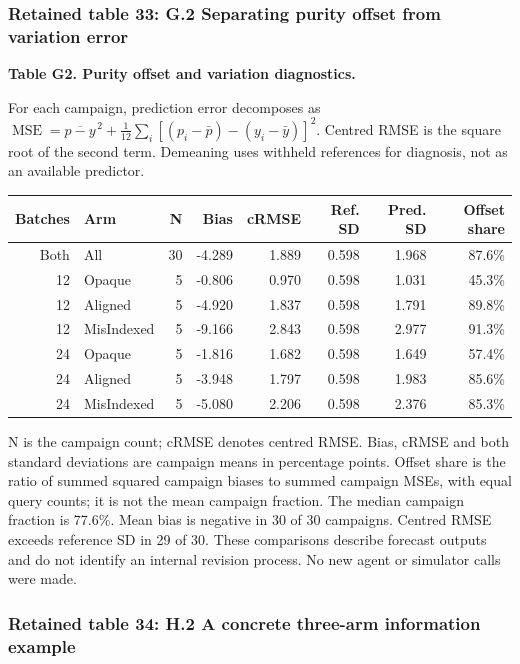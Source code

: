 \documentclass[10pt,a4paper]{article}
\begin{document}
\subsubsection{Retained table 33: G.2 Separating purity offset from variation error}\label{retained-table-33-g.2-separating-purity-offset-from-variation-error}

\textbf{Table G2. Purity offset and variation diagnostics.}

For each campaign, prediction error decomposes as \(\operatorname{MSE}=\overline{p-y}^{\,2}+\frac{1}{12}\sum_i[(p_i-\bar p)-(y_i-\bar y)]^2\). Centred RMSE is the square root of the second term. Demeaning uses withheld references for diagnosis, not as an available predictor.

{\def\LTcaptype{table} %
\small\begin{longtable}[]{@{}rlrrrrrr@{}}
\toprule\noalign{}
Batches & Arm & N & Bias & cRMSE & Ref. SD & Pred. SD & Offset share \\
\midrule\noalign{}
\endhead
\bottomrule\noalign{}
\endlastfoot
Both & All & 30 & -4.289 & 1.889 & 0.598 & 1.968 & 87.6\% \\
12 & Opaque & 5 & -0.806 & 0.970 & 0.598 & 1.031 & 45.3\% \\
12 & Aligned & 5 & -4.920 & 1.837 & 0.598 & 1.791 & 89.8\% \\
12 & MisIndexed & 5 & -9.166 & 2.843 & 0.598 & 2.977 & 91.3\% \\
24 & Opaque & 5 & -1.816 & 1.682 & 0.598 & 1.649 & 57.4\% \\
24 & Aligned & 5 & -3.948 & 1.797 & 0.598 & 1.983 & 85.6\% \\
24 & MisIndexed & 5 & -5.080 & 2.206 & 0.598 & 2.376 & 85.3\% \\
\end{longtable}\normalsize
}

N is the campaign count; cRMSE denotes centred RMSE. Bias, cRMSE and both standard deviations are campaign means in percentage points. Offset share is the ratio of summed squared campaign biases to summed campaign MSEs, with equal query counts; it is not the mean campaign fraction. The median campaign fraction is 77.6\%. Mean bias is negative in 30 of 30 campaigns. Centred RMSE exceeds reference SD in 29 of 30. These comparisons describe forecast outputs and do not identify an internal revision process. No new agent or simulator calls were made.

\subsubsection{Retained table 34: H.2 A concrete three-arm information example}\label{retained-table-34-h.2-a-concrete-three-arm-information-example}
\end{document}
